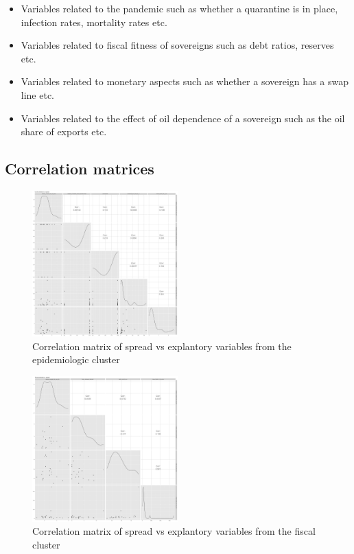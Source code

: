 \documentclass[11pt,]{article}
\providecommand{\tightlist}{%
\setlength{\itemsep}{0pt}\setlength{\parskip}{0pt}}
\begin{document}
\begin{itemize}
\tightlist
\item
  Variables related to the pandemic such as whether a quarantine is in
  place, infection rates, mortality rates etc.
\item
  Variables related to fiscal fitness of sovereigns such as debt ratios,
  reserves etc.
\item
  Variables related to monetary aspects such as whether a sovereign has
  a swap line etc.
\item
  Variables related to the effect of oil dependence of a sovereign such
  as the oil share of exports etc.
\end{itemize}

\hypertarget{correlation-matrices}{%
\subsection{Correlation matrices}\label{correlation-matrices}}

\begin{figure}
\centering
\includegraphics[width=0.5\textwidth,height=\textheight]{reportfigures/Corrmatrix_spread_vs_covid.png}
\caption{Correlation matrix of spread vs explantory variables from the
epidemiologic cluster}
\end{figure}

\begin{figure}
\centering
\includegraphics[width=0.5\textwidth,height=\textheight]{reportfigures/Corrmatrix_spread_vs_fiscal.png}
\caption{Correlation matrix of spread vs explantory variables from the
fiscal cluster}
\end{figure}
\end{document}
